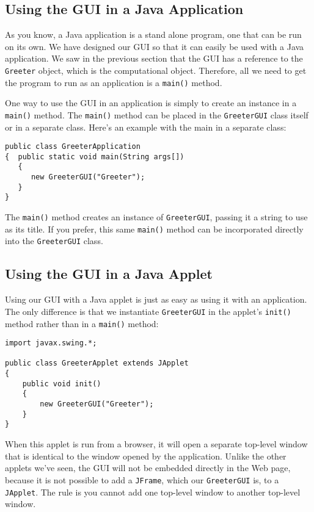 \subsection{Using the GUI in a Java Application}

As you know, a Java application is a stand alone program, one that can
be run on its own.  We have designed our GUI so that it can easily be
used with a Java application. We saw in the previous section that the
GUI has a reference to the {\tt Greeter} object, which is the
computational object. Therefore, all we need to get the program to run
as an application is a {\tt main()} method.

One way to use the GUI in an application is simply to create an instance
in a {\tt main()} method. The {\tt main()} method can be placed in the
{\tt GreeterGUI} class itself or in a separate class. Here's an example
with the main in a separate class:

\begin{jjjlisting}
\begin{lstlisting}
public class GreeterApplication 
{  public static void main(String args[]) 
   {  
      new GreeterGUI("Greeter");	
   }
}
\end{lstlisting}
\end{jjjlisting}

\noindent The {\tt main()} method creates an instance of 
{\tt GreeterGUI}, passing it a string to use as its title.  If you
prefer, this same {\tt main()} method can be incorporated directly
into the {\tt GreeterGUI} class.

\subsection{Using the GUI in a Java Applet}

Using our GUI with a Java applet is just as easy as using it
with an application. The only difference is that we instantiate
{\tt GreeterGUI} in the applet's {\tt init()} method rather than
in a {\tt main()} method:

\begin{jjjlisting}
\begin{lstlisting}
import javax.swing.*;

public class GreeterApplet extends JApplet 
{
    public void init() 
    {
        new GreeterGUI("Greeter");
    }
}
\end{lstlisting}
\end{jjjlisting}

\noindent When this applet is run from a browser, it will open a
separate top-level window that is identical to the window opened by
the application. Unlike the other applets we've seen, the GUI will not
be embedded directly in the Web page, because it is not possible to
add a {\tt JFrame}, which our {\tt GreeterGUI} is, to a {\tt
JApplet}. The rule is you cannot add one top-level window to another
top-level window.

